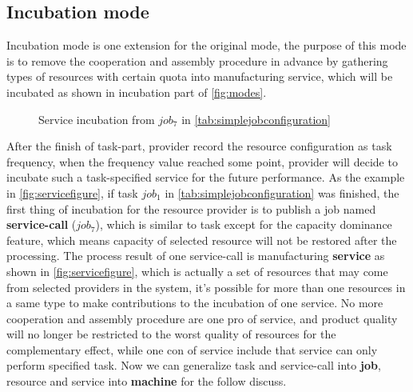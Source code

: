 \subsection{Incubation mode} %
\label{sub:incubation_mode}
Incubation mode is one extension for the original mode, the purpose of this mode is to remove the cooperation and assembly procedure in advance by gathering types of resources with certain quota into manufacturing service, which will be incubated as shown in incubation part of \autoref{fig:modes}.
\begin{figure}[htbp]
    \centering
    \scriptsize
    \resizebox{.65\textwidth}{!}{}
    \caption{Service incubation from $job_7$ in \autoref{tab:simplejobconfiguration}}
    \label{fig:servicefigure}
\end{figure}
After the finish of task-part, provider record the resource configuration as task frequency, when the frequency value reached some point, provider will decide to incubate such a task-specified service for the future performance. As the example in \autoref{fig:servicefigure}, if task $job_1$ in \autoref{tab:simplejobconfiguration} was finished, the first thing of incubation for the resource provider is to publish a job named \textbf{service-call} ($job_7$), which is similar to task except for the capacity dominance feature, which means capacity of selected resource will not be restored after the processing. The process result of one service-call is manufacturing \textbf{service} as shown in \autoref{fig:servicefigure}, which is actually a set of resources that may come from selected providers in the system, it's possible for more than one resources in a same type to make contributions to the incubation of one service. No more cooperation and assembly procedure are one pro of service, and product quality will no longer be restricted to the worst quality of resources for the complementary effect, while one con of service include that service can only perform specified task.
Now we can generalize task and service-call into \textbf{job}, resource and service into \textbf{machine} for the follow discuss.

